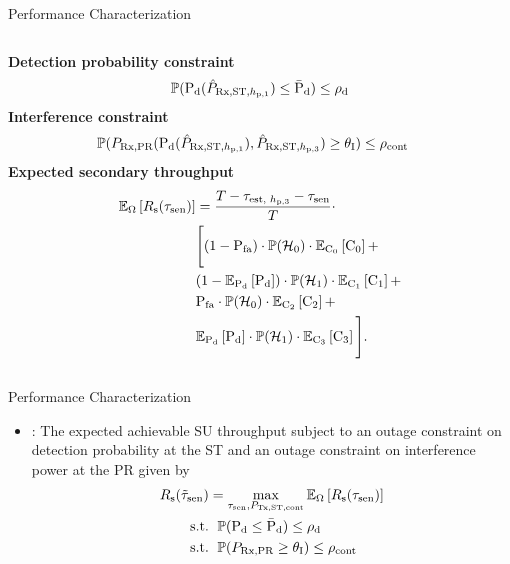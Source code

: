 \documentclass[12pt]{beamer}
\newcommand{\fs}[2]{\fontsize{#1 pt}{#2}\selectfont}
\begin{document}
\begin{frame}{Performance Characterization}
\begin{columns}[t]
\begin{column}{0.48 \paperwidth}
\begin{center}
		\textbf{Detection probability constraint} 
		\begin{align*}
		\p(\pd(\eprcvdstpt) \le \pdd) &\le \opdc \\
		\end{align*}
		\textbf{Interference constraint} 
		\begin{align*}
		\p(\prcvdpr(\pd(\eprcvdstpt), \eprcvdstpr) \ge \ite) &\le \opc 
		\end{align*}
		\textbf{Expected secondary throughput}
		\begin{align*}
		\e{\Omega}{\rs(\tsen)} &= \frac{T - \testpr - \tsen}{T} \cdot \\ &\Bigg[ (1 - \pfa) \cdot \phz \cdot \e{\cz}{\cz} + \\  & (1 - \e{\pd}\pd) \cdot \pho \cdot \e{\co}{\co}  + \\ &\pfa \cdot \phz \cdot \e{\ctw}{\ctw} +  \nonumber \\ & \e{\pd}{\pd} \cdot \pho \cdot \e{\cth}{\cth} \Bigg]. 
		\end{align*}
		\end{center}
	\end{column}
	\end{columns}
\end{frame}


\begin{frame}{Performance Characterization}
        \fs{8}{8}
		\begin{center}	
		\begin{itemize}
		\item {}: The expected achievable SU throughput subject to an outage constraint on detection probability at the ST and an outage constraint on interference power at the PR given by
		\begin{align*}
		\rs(\ttsen) &= \maxi_{\tsen, \preg} \e{\Omega}{\rs(\tsen)} \\
		\text{s.t.} & \text{ }\; \p(\pd \le \pdd) \le \opdc \\
		\text{s.t.} & \text{ }\; \p(\prcvdpr \ge \ite) \le \opc 
		\end{align*}
		\end{itemize}
		\end{center}
\end{frame}
\end{document}

